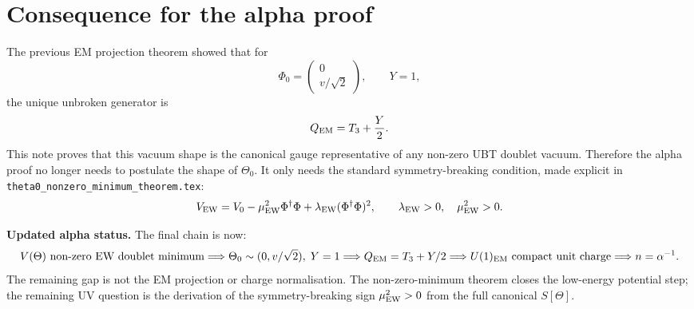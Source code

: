 \documentclass[12pt,a4paper]{article}
\begin{document}
\section{Consequence for the alpha proof}

The previous EM projection theorem showed that for
\[
  \Phi_0=\begin{pmatrix}0\\v/\sqrt2\end{pmatrix},
  \qquad Y=1,
\]
the unique unbroken generator is
\[
  Q_{\rm EM}=T_3+\frac{Y}{2}.
\]
This note proves that this vacuum shape is the canonical gauge representative of
any non-zero UBT doublet vacuum.  Therefore the alpha proof no longer needs to
postulate the shape of \(\Theta_0\).  It only needs the standard symmetry-breaking condition, made explicit in
\texttt{theta0\_nonzero\_minimum\_theorem.tex}:
\[
  V_{\rm EW}=V_0-\mu_{\rm EW}^2\Phi^\dagger\Phi+\lambda_{\rm EW}(\Phi^\dagger\Phi)^2,
  \qquad \lambda_{\rm EW}>0,\quad \mu_{\rm EW}^2>0.
\]

\begin{resultbox}
\textbf{Updated alpha status.} The final chain is now:
\[
  V(\Theta)\text{ non-zero EW doublet minimum}
  \Longrightarrow
  \Theta_0\sim(0,v/\sqrt2),\;Y=1
  \Longrightarrow
  Q_{\rm EM}=T_3+Y/2
  \Longrightarrow
  U(1)_{\rm EM}\text{ compact unit charge}
  \Longrightarrow
  n=\alpha^{-1}.
\]
The remaining gap is not the EM projection or charge normalisation.  The
non-zero-minimum theorem closes the low-energy potential step; the remaining UV
question is the derivation of the symmetry-breaking sign \(\mu_{\rm EW}^2>0\)
from the full canonical \(S[\Theta]\).
\end{resultbox}

\ifdefined\INCLUDEMODE\else
\end{document}
